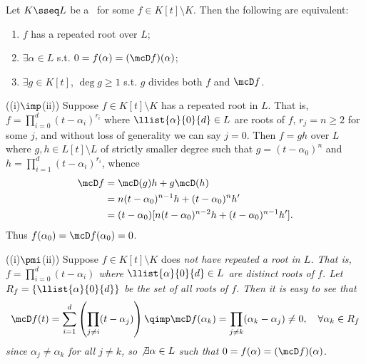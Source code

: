 \documentclass{article}
\begin{document}
\setcounter{section}{8} %
\begin{exercise} %
  Let \( K\sseq L \) be a \sfe~for some \( f\in K[t]\setminus K \).
  Then the following are equivalent: \begin{enumerate}[label=(\roman*)]
    \item \( f \) has a repeated root over \( L \);
    \item \( \exists \alpha\in L \) s.t. \( 0=f(\alpha)=(\mcD f)(\alpha) \);
    \item \( \exists g\in K[t] \), \( \deg g \geq 1 \) s.t. \( g \) divides both \( f \) and \( \mcD f \).
  \end{enumerate}
\end{exercise}
\begin{solution}

  ((i)\( \imp \)(ii)) Suppose \( f \in K[t]\setminus K \) has a repeated root in \( L \).
  That is, \( f = \prod_{i=0}^{d}(t-\alpha_i)^{r_i} \) where \( \llist{\alpha}{0}{d} \in L \) are roots of \( f \), \( r_j = n \geq 2 \) for some \( j \), and without loss of generality we can say \( j=0 \).
  Then \( f=gh \) over \( L \) where \( g,h\in L[t]\setminus L \) of strictly smaller degree such that \( g=(t-\alpha_0)^n \) and \( h=\prod_{i=1}^{d}(t-\alpha_i)^{r_i} \), whence
  \begin{align*}
  \mcD f &= \mcD(g)h + g\mcD(h)\\
         &= n(t-\alpha_0)^{n-1}h + (t-\alpha_0)^{n}h' \\
         &= (t-\alpha_0)[n(t-\alpha_0)^{n-2}h + (t-\alpha_0)^{n-1}h'].
  \end{align*}
  Thus \( f(\alpha_0) = \mcD f(\alpha_0) = 0 \).

  ((i)\( \pmi \)(ii)) Suppose \( f \in K[t]\setminus K \) does \it{not} have repeated a root in \( L \).
  That is, \( f = \prod_{i=0}^{d}(t-\alpha_i) \) where \( \llist{\alpha}{0}{d} \in L \) are distinct roots of \( f \).
  Let \( R_f = \{\llist{\alpha}{0}{d}\} \) be the set of all roots of \( f \).
  Then it is easy to see that \begin{align*}
    \mcD f(t) = \sum_{i=1}^{d}\left(\prod_{j\neq i} (t-\alpha_j)\right) \qimp \mcD f(\alpha_k) = \prod_{j\neq k} (\alpha_k-\alpha_j) \neq 0, \quad\forall \alpha_k\in R_f
  \end{align*}
  since \( \alpha_j\neq \alpha_k \) for all \( j\neq k \), so \( \not\exists \alpha\in L \) such that \( 0=f(\alpha)=(\mcD f)(\alpha) \).


\end{solution}
\end{document}
